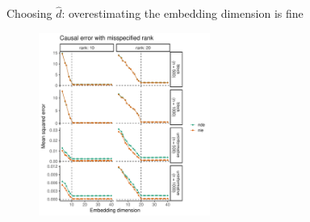 \documentclass[aspectratio=169]{beamer}
\theoremstyle{remark}
\begin{document}
\begin{frame}{Choosing $\widehat{d}$: overestimating the embedding dimension is fine}

    \centering

    \begin{figure}
        \includegraphics[width=0.5\textwidth]{figures/misspecification/loss_average.pdf}
    \end{figure}

\end{frame}






\end{document}
